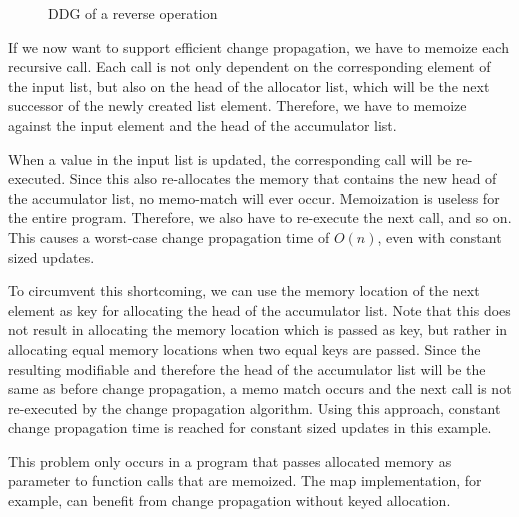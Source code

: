 \begin{figure}
\begin{center}
\end{center}
\caption{DDG of a reverse operation}
\label{fig:reverse_ddg}
\end{figure}

If we now want to support efficient change propagation, we have to memoize each recursive call. Each call is not only dependent on the corresponding element of the input list, but also on the head of the allocator list, which will be the next successor of the newly created list element. Therefore, we have to memoize against the input element and the head of the accumulator list. 

When a value in the input list is updated, the corresponding call will be re-executed. Since this also re-allocates the memory that contains the new head of the accumulator list, no memo-match will ever occur. Memoization is useless for the entire program. Therefore, we also have to re-execute the next call, and so on. This causes a worst-case change propagation time of $O(n)$, even with constant sized updates. 

To circumvent this shortcoming, we can use the memory location of the next element as key for allocating the head of the accumulator list. Note that this does not result in allocating the memory location which is passed as key, but rather in allocating equal memory locations when two equal keys are passed. Since the resulting modifiable and therefore the head of the accumulator list will be the same as before change propagation, a memo match occurs and the next call is not re-executed by the change propagation algorithm. Using this approach, constant change propagation time is reached for constant sized updates in this example. 

This problem only occurs in a program that passes allocated memory as parameter to function calls that are memoized. The map implementation, for example, can benefit from change propagation without keyed allocation.  

